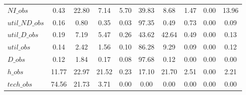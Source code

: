 \begin{center}
\begin{longtable}{lccccccccc}
$NI\_obs        $	 & 	         0.43	 & 	        22.80	 & 	         7.14	 & 	         5.70	 & 	        39.83	 & 	         8.68	 & 	         1.47	 & 	         0.00	 & 	        13.96 \\ 
$util\_ND\_obs  $	 & 	         0.16	 & 	         0.80	 & 	         0.35	 & 	         0.03	 & 	        97.35	 & 	         0.49	 & 	         0.73	 & 	         0.00	 & 	         0.09 \\ 
$util\_D\_obs   $	 & 	         0.19	 & 	         7.19	 & 	         5.47	 & 	         0.26	 & 	        43.62	 & 	        42.64	 & 	         0.49	 & 	         0.00	 & 	         0.13 \\ 
$util\_obs      $	 & 	         0.14	 & 	         2.42	 & 	         1.56	 & 	         0.10	 & 	        86.28	 & 	         9.29	 & 	         0.09	 & 	         0.00	 & 	         0.12 \\ 
$D\_obs         $	 & 	         0.12	 & 	         1.84	 & 	         0.17	 & 	         0.08	 & 	        97.68	 & 	         0.12	 & 	         0.00	 & 	         0.00	 & 	         0.00 \\ 
$h\_obs         $	 & 	        11.77	 & 	        22.97	 & 	        21.52	 & 	         0.23	 & 	        17.10	 & 	        21.70	 & 	         2.51	 & 	         0.00	 & 	         2.21 \\ 
$tech\_obs      $	 & 	        74.56	 & 	        21.73	 & 	         3.71	 & 	         0.00	 & 	         0.00	 & 	         0.00	 & 	         0.00	 & 	         0.00	 & 	         0.00 \\ 
\end{longtable}
 \end{center}
